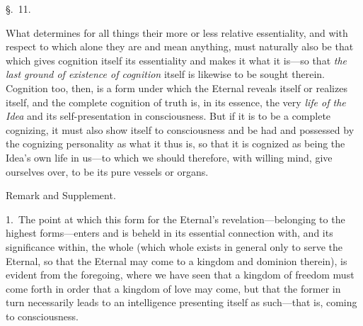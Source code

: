 \documentclass[12pt,a4paper]{book}
\begin{document}
\begin{center}\large\S.~11.\end{center}
What determines for all things their more or less relative essentiality, and with
respect to which alone they are and mean anything, must naturally also be that which
gives cognition itself its essentiality and makes it what it is---so that \emph{the
last ground of existence of cognition} itself is likewise to be sought therein.
Cognition too, then, is a form under which the Eternal reveals itself or realizes
itself, and the complete cognition of truth is, in its essence, the very \emph{life
of the Idea} and its self-presentation in consciousness. But if it is to be a complete
cognizing, it must also show itself to consciousness and be had and possessed by the
cognizing personality as what it thus is, so that it is cognized as being the Idea's
own life in us---to which we should therefore, with willing mind, give ourselves
over, to be its pure vessels or organs.

\begin{center}Remark and Supplement.\end{center}
1.~The point at which this form for the Eternal's revelation---belonging to the
highest forms---enters and is beheld in its essential connection with, and its
significance within, the whole (which whole exists in general only to serve the
Eternal, so that the Eternal may come to a kingdom and dominion therein), is evident
from the foregoing, where we have seen that a kingdom of freedom must come forth in
order that a kingdom of love may come, but that the former in turn necessarily leads
to an intelligence presenting itself as such---that is, coming to consciousness.
\end{document}
